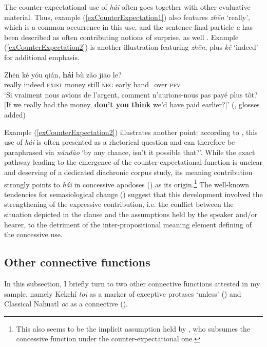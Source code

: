 The counter-expectational use of \textit{hái} often goes together with other evaluative material. Thus, example (\ref{exCounterExpectation1}) also features \textit{zhēn} \lq really\rq{}, which is a common occurrence in this use, and the sentence-final particle \textit{a} has been described as often contributing notions of surprise, as well \parencite{HuangShi2016}. Example (\ref{exCounterExpectation2}) is another illustration featuring \textit{zhēn}, plus \textit{kě} \lq indeed\rq{ }for additional emphasis.

\begin{exe}
	\ex\label{exCounterExpectation2}
	\gll Zhēn	ké	yóu	qián,	\textbf{hái}	bù	zǎo	jiāo	le?\\
	really indeed \textsc{exist} money still \textsc{neg} early hand\_over \textsc{pfv}\\
	\glt \lq Si vraiment nous avions de l'argent, comment n'aurions-nous pas payé plus tôt? [If we really had the money, \textbf{don't you think} we'd have paid earlier?]\rq{ }(\cite[16]{Alleton1972}, glosses added)
\end{exe}

Example (\ref{exCounterExpectation2}) illustrates another point: according to \textcite[ch. 2.3]{Alleton1972}, this use of \textit{hái} is often presented as a rhetorical question and can therefore be paraphrased via \textit{nándào} \lq by any chance, isn't it possible that?\rq{}. While the exact pathway leading to the emergence of the counter-expectational function is unclear and deserving of a dedicated diachronic corpus study, its meaning contribution strongly points to \textit{hái} in concessive apodoses () as its origin.\footnote{This also seems to be the implicit assumption held by \textcite{Alleton1972}, who subsumes the concessive function under the counter-expectational one.} The well-known tendencies for semasiological change () suggest that this development involved the strengthening of the expressive contribution, i.e. the conflict between the situation depicted in the clause and the assumptions held by the speaker and/or hearer, to the detriment of the inter-propositional meaning element defining of the concessive use.

\subsection{Other connective functions}\label{sectionOtherConnective}
In this subsection, I briefly turn to two other connective functions attested in my sample, namely Kekchí \textit{toj} as a marker of exceptive protases \lq unless\rq{ }() and Classical Nahuatl \textit{oc} as a  connective ().


